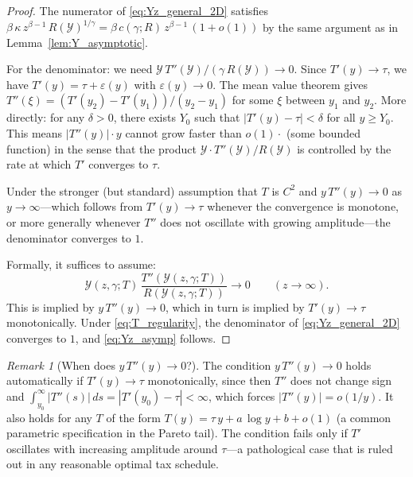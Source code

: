 \documentclass[12pt,a4paper]{article}
\theoremstyle{definition}
\theoremstyle{plain}
\theoremstyle{remark}
\newtheorem{remark}{Remark}[section]
\newcommand{\calY}{\mathcal{Y}}
\begin{document}
\begin{proof}
The numerator of \eqref{eq:Yz_general_2D} satisfies $\beta\,\kappa\,z^{\beta-1}\,R(\calY)^{1/\gamma} = \beta\,c(\gamma;R)\,z^{\beta-1}\,(1 + o(1))$ by the same argument as in Lemma~\ref{lem:Y_asymptotic}.

For the denominator: we need $\calY\,T''(\calY)/(\gamma\,R(\calY)) \to 0$.  Since $T'(y) \to \tau$, we have $T'(y) = \tau + \varepsilon(y)$ with $\varepsilon(y) \to 0$.  The mean value theorem gives $T''(\xi) = (T'(y_2) - T'(y_1))/(y_2 - y_1)$ for some $\xi$ between $y_1$ and $y_2$.  More directly: for any $\delta > 0$, there exists $Y_0$ such that $|T'(y) - \tau| < \delta$ for all $y \geq Y_0$.  This means $|T''(y)| \cdot y$ cannot grow faster than $o(1) \cdot$ (some bounded function) in the sense that the product $\calY \cdot T''(\calY) / R(\calY)$ is controlled by the rate at which $T'$ converges to $\tau$.

Under the stronger (but standard) assumption that $T$ is $C^2$ and $y\,T''(y) \to 0$ as $y \to \infty$---which follows from $T'(y) \to \tau$ whenever the convergence is monotone, or more generally whenever $T''$ does not oscillate with growing amplitude---the denominator converges to $1$.

Formally, it suffices to assume:
\begin{equation}
\label{eq:T_regularity}
  \calY(z,\gamma;T)\,\frac{T''(\calY(z,\gamma;T))}{R(\calY(z,\gamma;T))} \to 0 \qquad (z \to \infty).
\end{equation}
This is implied by $y\,T''(y) \to 0$, which in turn is implied by $T'(y) \to \tau$ monotonically.  Under \eqref{eq:T_regularity}, the denominator of \eqref{eq:Yz_general_2D} converges to $1$, and \eqref{eq:Yz_asymp} follows.
\end{proof}

\begin{remark}[When does $y\,T''(y) \to 0$?]
\label{rem:yTpp}
The condition $y\,T''(y) \to 0$ holds automatically if $T'(y) \to \tau$ monotonically, since then $T''$ does not change sign and $\int_{y_0}^{\infty}|T''(s)|\,ds = |T'(y_0) - \tau| < \infty$, which forces $|T''(y)| = o(1/y)$.  It also holds for any $T$ of the form $T(y) = \tau\,y + a\,\log y + b + o(1)$ (a common parametric specification in the Pareto tail).  The condition fails only if $T'$ oscillates with increasing amplitude around $\tau$---a pathological case that is ruled out in any reasonable optimal tax schedule.
\end{remark}
\end{document}
